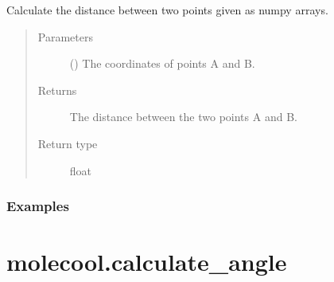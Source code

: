 \documentclass[letterpaper,10pt,english]{sphinxmanual}
\begin{document}
\begin{fulllineitems}
\label{\detokenize{autosummary/molecool.calculate_distance:molecool.calculate_distance}}
Calculate the distance between two points given as numpy arrays.
\begin{quote}\begin{description}
\item[{Parameters}] \leavevmode
{} () \textendash{} The coordinates of points A and B.

\item[{Returns}] \leavevmode
{} \textendash{} The distance between the two points A and B.

\item[{Return type}] \leavevmode
float

\end{description}\end{quote}
\subsubsection*{Examples}

\begin{sphinxVerbatim}[commandchars=\\\{\}]
  \PYG{p}{[}  \PYG{p}{]}
  \PYG{p}{[}  \PYG{p}{]}
 
\end{sphinxVerbatim}

\end{fulllineitems}



\section{molecool.calculate\_angle}
\label{\detokenize{autosummary/molecool.calculate_angle:molecool-calculate-angle}}\label{\detokenize{autosummary/molecool.calculate_angle::doc}}
\end{document}
